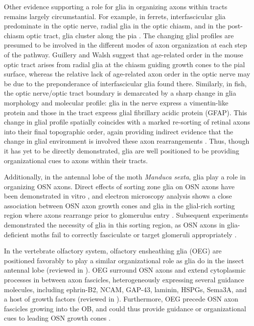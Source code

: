 Other evidence supporting a role for glia in organizing axons within tracts remains largely circumstantial. 
For example, in ferrets, interfascicular glia predominate in the optic nerve, radial glia in the optic chiasm, and in the post-chiasm optic tract, glia cluster along the pia \cite{colello1992observations,guillery1987changing}. 
The changing glial profiles are presumed to be involved in the different modes of axon organization at each step of the pathway. 
Guillery and Walsh  suggest that age-related order in the mouse optic tract arises from radial glia at the chiasm guiding growth cones to the pial surface, whereas the relative lack of age-related axon order in the optic nerve may be due to the preponderance of interfascicular glia found there. 
Similarly, in fish, the optic nerve/optic tract boundary is demarcated by a sharp change in glia morphology and molecular profile: glia in the nerve express a vimentin-like protein and those in the tract express glial fibrillary acidic protein (GFAP).
This change in glial profile spatially coincides with a marked re-sorting of retinal axons into their final topographic order, again providing indirect evidence that the change in glial environment is involved these axon rearrangements \cite{maggs1986glial}.
Thus, though it has yet to be directly demonstrated, glia are well positioned to be providing organizational cues to axons within their tracts.

Additionally, in the antennal lobe of the moth \emph{Manduca sexta}, glia play a role in organizing OSN axons.
Direct effects of sorting zone glia on OSN axons have been demonstrated in vitro \cite{tucker2004vitro}, and electron microscopy analysis shows a close association between OSN axon growth cones and glia in the glial-rich sorting region where axons rearrange prior to glomerulus entry \cite{oland1998targeted}.
Subsequent experiments demonstrated the necessity of glia in this sorting region, as OSN axons in glia-deficient moths fail to correctly fasciculate or target glomeruli appropriately \cite{rossler1999development}. 

In the vertebrate olfactory system, olfactory ensheathing glia (OEG) are positioned favorably to play a similar organizational role as glia do in the insect antennal lobe (reviewed in ).
OEG surround OSN axons and extend cytoplasmic processes in between axon fascicles, heterogeneously expressing several guidance molecules, including ephrin-B2, NCAM, GAP-43, laminin, HSPGs, Sema3A, and a host of growth factors (reviewed in ).
Furthermore, OEG precede OSN axon fascicles growing into the OB, and could thus provide guidance or organizational cues to leading OSN growth cones \cite{chuah2002cellular,tolbert2004bidirectional}.

